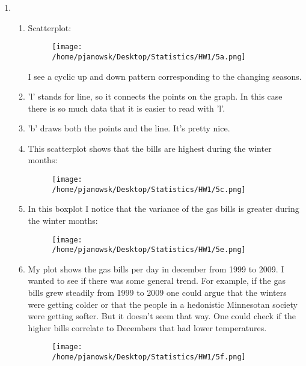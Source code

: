 \documentclass[11pt,letterpaper]{article}
\begin{document}
\begin{enumerate}
\begin{enumerate}
  \end{enumerate}
\item
  \begin{enumerate}
  \item Scatterplot:
    	\begin{figure}[H]
    	\centering
    	\texttt{[image: /home/pjanowsk/Desktop/Statistics/HW1/5a.png]}
    	\end{figure}
    	I see a cyclic up and down pattern corresponding to the changing seasons.
  \item 'l' stands for line, so it connects the points on the graph. In this case there is so much data that it is easier to read with 'l'.
  \item 'b' draws both the points and the line. It's pretty nice. 
  \item This scatterplot shows that the bills are highest during the winter months:
      	\begin{figure}[H]
      	\centering
      	\texttt{[image: /home/pjanowsk/Desktop/Statistics/HW1/5c.png]}
      	\end{figure}
  \item In this boxplot I notice that the variance of the gas bills is greater during the winter months:
        	\begin{figure}[H]
        	\centering
        	\texttt{[image: /home/pjanowsk/Desktop/Statistics/HW1/5e.png]}
        	\end{figure}
  \item My plot shows the gas bills per day in december from 1999 to 2009. I wanted to see if there was some general trend. For example, if the gas bills grew steadily from 1999 to 2009 one could argue that the winters were getting colder or that the people in a hedonistic Minnesotan society were getting softer. But it doesn't seem that way. One could check if the higher bills correlate to Decembers that had lower temperatures.
          	\begin{figure}[H]
          	\centering
          	\texttt{[image: /home/pjanowsk/Desktop/Statistics/HW1/5f.png]}
          	\end{figure}
  \end{enumerate}
\end{enumerate}
\end{document}
